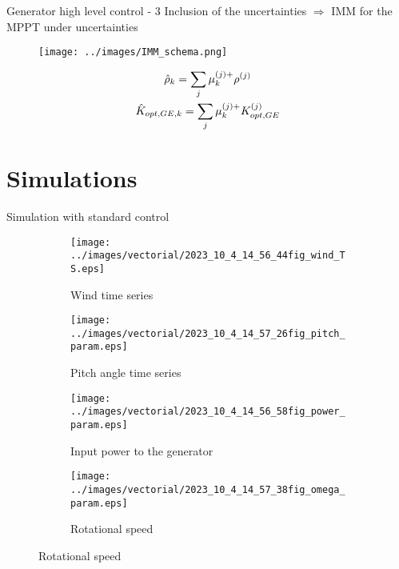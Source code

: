 \begin{frame}{Generator high level control - 3}
  Inclusion of the uncertainties $\Rightarrow$ IMM for the MPPT under uncertainties\\

  \begin{figure}[H]
    \centering
    \texttt{[image: ../images/IMM\_schema.png]}
  \end{figure}
  \begin{gather}
    \notag
    \hat{\rho}_{k} = \sum_j \mu_k^{(j)+} \rho^{(j)}\\ \notag
    \hat{K}_{opt,GE,k} = \sum_j \mu_k^{(j)+} K_{opt,GE}^{(j)} 
  \end{gather}

\end{frame}

                                                        
\section{Simulations}
\begin{frame}{Simulation with standard control}
  \begin{figure}[!htbp]
    \begin{subfigure}{0.49\columnwidth}
      \centering
      \texttt{[image: ../images/vectorial/2023\_10\_4\_14\_56\_44fig\_wind\_TS.eps]}
      \caption{Wind time series}
    \end{subfigure}
    \begin{subfigure}{0.49\columnwidth}
      \centering
      \texttt{[image: ../images/vectorial/2023\_10\_4\_14\_57\_26fig\_pitch\_param.eps]}
      \caption{Pitch angle time series}
    \end{subfigure}
    \begin{subfigure}{0.49\columnwidth}
      \centering
      \texttt{[image: ../images/vectorial/2023\_10\_4\_14\_56\_58fig\_power\_param.eps]}
      \caption{Input power to the generator}
    \end{subfigure}
    \begin{subfigure}{0.49\columnwidth}
      \centering
      \texttt{[image: ../images/vectorial/2023\_10\_4\_14\_57\_38fig\_omega\_param.eps]}
      \caption{Rotational speed}
    \end{subfigure}
  \end{figure}
\end{frame}

